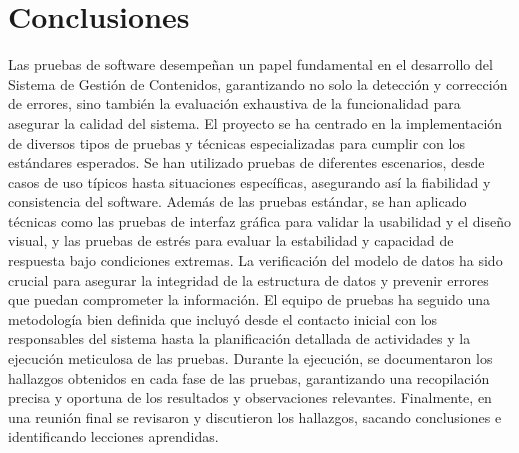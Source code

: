 \documentclass[10pt,times,twocolumn]{article}
\begin{document}
\section{Conclusiones}
Las pruebas de software desempeñan un papel fundamental en el desarrollo del Sistema de Gestión de Contenidos, garantizando no solo la detección y corrección de errores, sino también la evaluación exhaustiva de la funcionalidad para asegurar la calidad del sistema. \newline
El proyecto se ha centrado en la implementación de diversos tipos de pruebas y técnicas especializadas para cumplir con los estándares esperados. Se han utilizado pruebas de diferentes escenarios, desde casos de uso típicos hasta situaciones específicas, asegurando así la fiabilidad y consistencia del software. \newline
Además de las pruebas estándar, se han aplicado técnicas como las pruebas de interfaz gráfica para validar la usabilidad y el diseño visual, y las pruebas de estrés para evaluar la estabilidad y capacidad de respuesta bajo condiciones extremas. La verificación del modelo de datos ha sido crucial para asegurar la integridad de la estructura de datos y prevenir errores que puedan comprometer la información. \newline
El equipo de pruebas ha seguido una metodología bien definida que incluyó desde el contacto inicial con los responsables del sistema hasta la planificación detallada de actividades y la ejecución meticulosa de las pruebas. \newline
Durante la ejecución, se documentaron los hallazgos obtenidos en cada fase de las pruebas, garantizando una recopilación precisa y oportuna de los resultados y observaciones relevantes. Finalmente, en una reunión final se revisaron y discutieron los hallazgos, sacando conclusiones e identificando lecciones aprendidas.

\printbibliography
\end{document}
